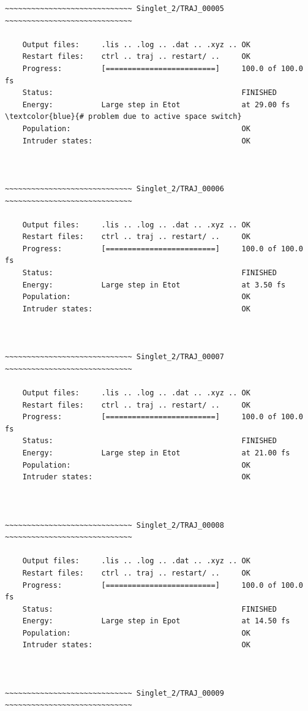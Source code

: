 \documentclass[a4paper,11pt,DIV=15,openany]{scrbook}
\begin{document}
\begin{oframed}
\begin{Verbatim}[commandchars=\\\{\}]
~~~~~~~~~~~~~~~~~~~~~~~~~~~~~ Singlet_2/TRAJ_00005 ~~~~~~~~~~~~~~~~~~~~~~~~~~~~~

    Output files:     .lis .. .log .. .dat .. .xyz .. OK
    Restart files:    ctrl .. traj .. restart/ ..     OK
    Progress:         [=========================]     100.0 of 100.0 fs
    Status:                                           FINISHED
    Energy:           Large step in Etot              at 29.00 fs    \textcolor{blue}{# problem due to active space switch}
    Population:                                       OK
    Intruder states:                                  OK



~~~~~~~~~~~~~~~~~~~~~~~~~~~~~ Singlet_2/TRAJ_00006 ~~~~~~~~~~~~~~~~~~~~~~~~~~~~~

    Output files:     .lis .. .log .. .dat .. .xyz .. OK
    Restart files:    ctrl .. traj .. restart/ ..     OK
    Progress:         [=========================]     100.0 of 100.0 fs
    Status:                                           FINISHED
    Energy:           Large step in Etot              at 3.50 fs
    Population:                                       OK
    Intruder states:                                  OK



~~~~~~~~~~~~~~~~~~~~~~~~~~~~~ Singlet_2/TRAJ_00007 ~~~~~~~~~~~~~~~~~~~~~~~~~~~~~

    Output files:     .lis .. .log .. .dat .. .xyz .. OK
    Restart files:    ctrl .. traj .. restart/ ..     OK
    Progress:         [=========================]     100.0 of 100.0 fs
    Status:                                           FINISHED
    Energy:           Large step in Etot              at 21.00 fs
    Population:                                       OK
    Intruder states:                                  OK



~~~~~~~~~~~~~~~~~~~~~~~~~~~~~ Singlet_2/TRAJ_00008 ~~~~~~~~~~~~~~~~~~~~~~~~~~~~~

    Output files:     .lis .. .log .. .dat .. .xyz .. OK
    Restart files:    ctrl .. traj .. restart/ ..     OK
    Progress:         [=========================]     100.0 of 100.0 fs
    Status:                                           FINISHED
    Energy:           Large step in Epot              at 14.50 fs
    Population:                                       OK
    Intruder states:                                  OK



~~~~~~~~~~~~~~~~~~~~~~~~~~~~~ Singlet_2/TRAJ_00009 ~~~~~~~~~~~~~~~~~~~~~~~~~~~~~


\end{Verbatim}
\end{oframed}
\end{document}
